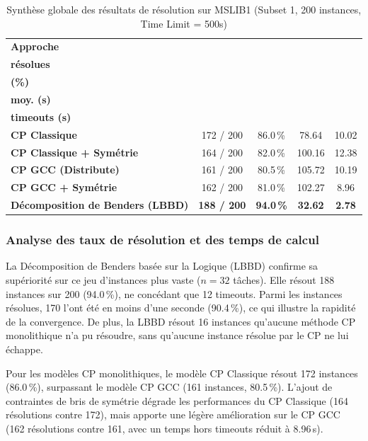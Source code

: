 \begin{table}[H]
    \centering
    \caption{Synthèse globale des résultats de résolution sur MSLIB1 (Subset 1, 200 instances, Time Limit = 500s)}
    \label{tab:results_subset1}
    \small
    \renewcommand{\cellalign}{cc}
    \begin{tabularx}{\textwidth}{|X|c|c|c|c|}
        \hline
        \textbf{Approche} & \makecell{\textbf{Inst.} \\ \textbf{résolues}} & \makecell{\textbf{Succès} \\ \textbf{(\%)}} & \makecell{\textbf{Temps} \\ \textbf{moy. (s)}} & \makecell{\textbf{Temps hors} \\ \textbf{timeouts (s)}} \\ \hline
        \textbf{CP Classique} & 172 / 200 & 86.0\,\% & 78.64 & 10.02 \\ \hline
        \textbf{CP Classique + Symétrie} & 164 / 200 & 82.0\,\% & 100.16 & 12.38 \\ \hline
        \textbf{CP GCC (Distribute)} & 161 / 200 & 80.5\,\% & 105.72 & 10.19 \\ \hline
        \textbf{CP GCC + Symétrie} & 162 / 200 & 81.0\,\% & 102.27 & 8.96 \\ \hline
        \textbf{Décomposition de Benders (LBBD)} & \textbf{188 / 200} & \textbf{94.0\,\%} & \textbf{32.62} & \textbf{2.78} \\ \hline
    \end{tabularx}
\end{table}

\subsubsection{Analyse des taux de résolution et des temps de calcul}
La Décomposition de Benders basée sur la Logique (LBBD) confirme sa supériorité sur ce jeu d'instances plus vaste ($n = 32$ tâches). Elle résout 188 instances sur 200 (94.0\,\%), ne concédant que 12 timeouts. Parmi les instances résolues, 170 l'ont été en moins d'une seconde (90.4\,\%), ce qui illustre la rapidité de la convergence. De plus, la LBBD résout 16 instances qu'aucune méthode CP monolithique n'a pu résoudre, sans qu'aucune instance résolue par le CP ne lui échappe.

\bigskip

Pour les modèles CP monolithiques, le modèle CP Classique résout 172 instances (86.0\,\%), surpassant le modèle CP GCC (161 instances, 80.5\,\%). L'ajout de contraintes de bris de symétrie dégrade les performances du CP Classique (164 résolutions contre 172), mais apporte une légère amélioration sur le CP GCC (162 résolutions contre 161, avec un temps hors timeouts réduit à 8.96\,s).

